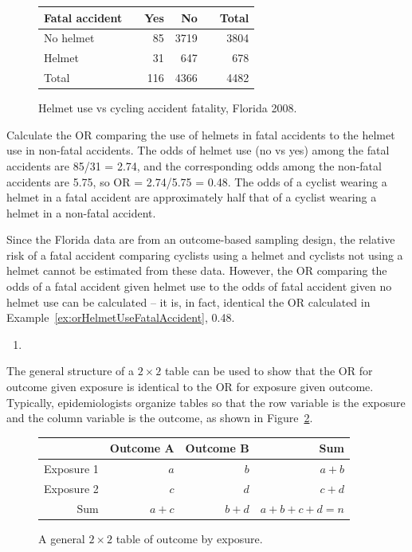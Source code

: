 \begin{figure}[h]
	\centering
	\begin{tabular}{ll rrr r}
		\hline
		Fatal accident	 & \hspace{2mm} & Yes & No & \hspace{2mm} & Total \\
		\hline
		No helmet & & 85 & 3719  &  & 3804  \\
		Helmet &	& 31 & 647 &  & 678  \\
        Total & & 116 & 4366 & & 4482 \\
		\hline
	\end{tabular}
	\caption{Helmet use vs cycling accident fatality, Florida 2008.}
    \label{figure:helmetUseBicycleAccidents}
\end{figure}	

\begin{examplewrap}
  \begin{nexample}{Calculate the OR comparing the use of helmets in fatal accidents to the helmet use in non-fatal accidents.} \label{ex:orHelmetUseFatalAccident}
    The odds of helmet use (no vs yes) among the fatal accidents are 85/31 = 2.74, and the corresponding odds among the non-fatal accidents are 5.75, so OR = 2.74/5.75 = 0.48.  The odds of a cyclist  wearing a helmet in a fatal accident are approximately half that of a cyclist wearing a helmet in a non-fatal accident. 
\end{nexample}
\end{examplewrap}

Since the Florida data are from an outcome-based sampling design, the relative risk of a fatal accident comparing cyclists using a helmet and cyclists not using a helmet cannot be estimated from these data. However, the OR comparing the odds of a fatal accident given helmet use to the odds of fatal accident given no helmet use can be calculated -- it is, in fact, identical the OR calculated in Example~\ref{ex:orHelmetUseFatalAccident}, 0.48.\begin{enumerate}
  \item 
\end{enumerate} 

The general structure of a $2 \times 2$ table can be used to show that the OR for outcome given exposure is identical to the OR for exposure given outcome.  Typically, epidemiologists organize tables so that the row variable is the exposure and the column variable is the outcome, as shown in Figure~\ref{figure:generalTwoByTwoTable}.
\begin{figure}[h!]
	\centering
	\begin{tabular}{r|rrr}
		\hline
		& Outcome A & Outcome B & Sum\\ 
		\hline
		Exposure 1 & $a$ & $b$ & $a + b$ \\ 
		Exposure 2 & $c$ & $d$ & $c + d$ \\
		Sum & $a + c$ & $b + d$ & $a + b + c + d = n$ \\
		\hline
	\end{tabular}	
  \caption{A general $2 \times 2$ table of outcome by exposure.}
  \label{figure:generalTwoByTwoTable}
  \end{figure}


